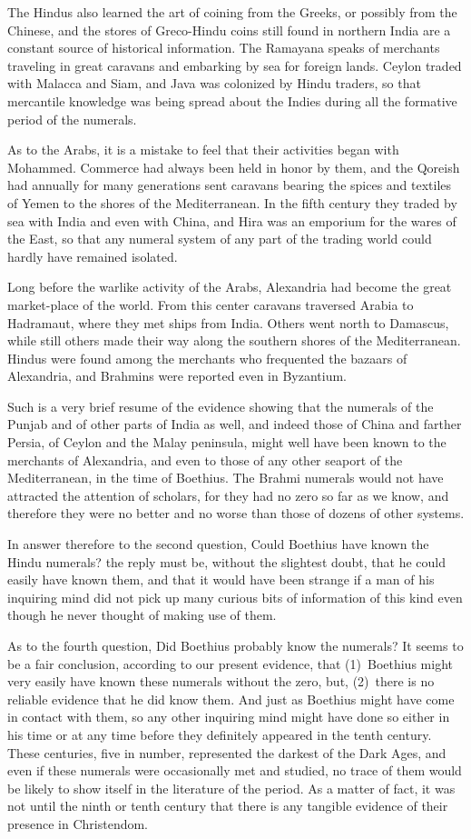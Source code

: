 \documentclass[11pt,a4paper]{article}
\begin{document}
The Hindus also learned the art of coining from the Greeks, or possibly from the Chinese, and the stores of Greco-Hindu coins still found in northern India are a constant source of historical information. The Ramayana speaks of merchants traveling in great caravans and embarking by sea for foreign lands. Ceylon traded with Malacca and Siam, and Java was colonized by Hindu traders, so that mercantile knowledge was being spread about the Indies during all the formative period of the numerals.

As to the Arabs, it is a mistake to feel that their activities began with Mohammed. Commerce had always been held in honor by them, and the Qoreish had annually for many generations sent caravans bearing the spices and textiles of Yemen to the shores of the Mediterranean. In the fifth century they traded by sea with India and even with China, and Hira was an emporium for the wares of the East, so that any numeral system of any part of the trading world could hardly have remained isolated.

Long before the warlike activity of the Arabs, Alexandria had become the great market-place of the world. From this center caravans traversed Arabia to Hadramaut, where they met ships from India. Others went north to Damascus, while still others made their way along the southern shores of the Mediterranean. Hindus were found among the merchants who frequented the bazaars of Alexandria, and Brahmins were reported even in Byzantium.

Such is a very brief resume of the evidence showing that the numerals of the Punjab and of other parts of India as well, and indeed those of China and farther Persia, of Ceylon and the Malay peninsula, might well have been known to the merchants of Alexandria, and even to those of any other seaport of the Mediterranean, in the time of Boethius. The Brahmi numerals would not have attracted the attention of scholars, for they had no zero so far as we know, and therefore they were no better and no worse than those of dozens of other systems.

In answer therefore to the second question, Could Boethius have known the Hindu numerals? the reply must be, without the slightest doubt, that he could easily have known them, and that it would have been strange if a man of his inquiring mind did not pick up many curious bits of information of this kind even though he never thought of making use of them.

As to the fourth question, Did Boethius probably know the numerals? It seems to be a fair conclusion, according to our present evidence, that (1)~Boethius might very easily have known these numerals without the zero, but, (2)~there is no reliable evidence that he did know them. And just as Boethius might have come in contact with them, so any other inquiring mind might have done so either in his time or at any time before they definitely appeared in the tenth century. These centuries, five in number, represented the darkest of the Dark Ages, and even if these numerals were occasionally met and studied, no trace of them would be likely to show itself in the literature of the period. As a matter of fact, it was not until the ninth or tenth century that there is any tangible evidence of their presence in Christendom.
\end{document}
